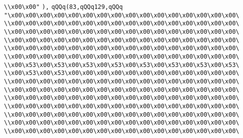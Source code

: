 \verb|\\x00\x00"|\newline
\verb|),|\newline
\verb|qQQq(83,qQQq129,qQQq|\newline
\verb|"\x00\x00\x00\x00\x00\x00\x00\x00\x00\x00\x00\x00\x00\x00\x00\x00\|\newline
\verb|\\x00\x00\x00\x00\x00\x00\x00\x00\x00\x00\x00\x00\x00\x00\x00\x00\|\newline
\verb|\\x00\x00\x00\x00\x00\x00\x00\x00\x00\x00\x00\x00\x00\x00\x00\x00\|\newline
\verb|\\x00\x00\x00\x00\x00\x00\x00\x00\x00\x00\x00\x00\x00\x00\x00\x00\|\newline
\verb|\\x00\x00\x00\x00\x00\x00\x00\x00\x00\x00\x00\x00\x00\x00\x00\x00\|\newline
\verb|\\x00\x00\x00\x00\x00\x00\x00\x00\x00\x00\x00\x00\x00\x00\x00\x00\|\newline
\verb|\\x00\x53\x00\x53\x00\x53\x00\x53\x00\x53\x00\x53\x00\x53\x00\x53\|\newline
\verb|\\x00\x53\x00\x53\x00\x00\x00\x00\x00\x00\x00\x00\x00\x00\x00\x00\|\newline
\verb|\\x00\x00\x00\x00\x00\x00\x00\x00\x00\x00\x00\x00\x00\x00\x00\x00\|\newline
\verb|\\x00\x00\x00\x00\x00\x00\x00\x00\x00\x00\x00\x00\x00\x00\x00\x00\|\newline
\verb|\\x00\x00\x00\x00\x00\x00\x00\x00\x00\x00\x00\x00\x00\x00\x00\x00\|\newline
\verb|\\x00\x00\x00\x00\x00\x00\x00\x00\x00\x00\x00\x00\x00\x00\x00\x00\|\newline
\verb|\\x00\x00\x00\x00\x00\x00\x00\x00\x00\x00\x00\x00\x00\x00\x00\x00\|\newline
\verb|\\x00\x00\x00\x00\x00\x00\x00\x00\x00\x00\x00\x00\x00\x00\x00\x00\|\newline
\verb|\\x00\x00\x00\x00\x00\x00\x00\x00\x00\x00\x00\x00\x00\x00\x00\x00\|\newline
